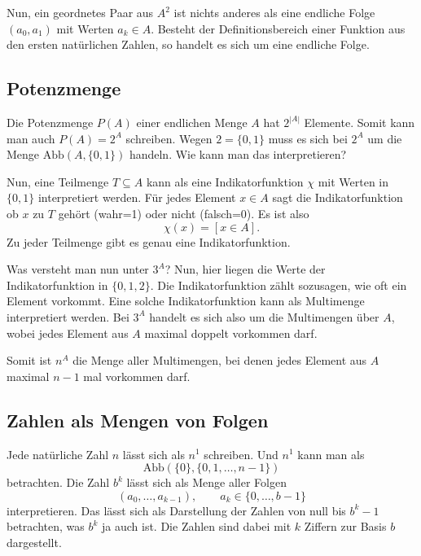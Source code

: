 \documentclass[a4paper,12pt,fleqn]{article}
\begin{document}
Nun, ein geordnetes Paar aus $A^2$ ist nichts anderes als eine
endliche Folge $(a_0,a_1)$ mit Werten $a_k\in A$. Besteht der
Definitionsbereich einer Funktion aus den ersten natürlichen Zahlen,
so handelt es sich um eine endliche Folge.

\subsection{Potenzmenge}
Die Potenzmenge $P(A)$ einer endlichen Menge $A$ hat
$2^{|A|}$ Elemente. Somit kann man auch $P(A)=2^A$ schreiben.
Wegen $2=\{0,1\}$ muss es sich bei $2^A$ um die Menge
$\mathrm{Abb}(A,\{0,1\})$ handeln. Wie kann man das interpretieren?

Nun, eine Teilmenge $T\subseteq A$ kann als eine
Indikatorfunktion \(\chi\) mit Werten in $\{0,1\}$ interpretiert werden.
Für jedes Element $x\in A$ sagt die Indikatorfunktion ob $x$
zu $T$ gehört (wahr=1) oder nicht (falsch=0). Es ist also
\[\chi(x) = [x\in A].\]
Zu jeder Teilmenge gibt es genau eine Indikatorfunktion.

Was versteht man nun unter $3^A$? Nun, hier liegen die Werte der
Indikatorfunktion in $\{0,1,2\}$. Die Indikatorfunktion zählt
sozusagen, wie oft ein Element vorkommt. Eine solche
Indikatorfunktion kann als Multimenge interpretiert werden.
Bei $3^A$ handelt es sich also um die Multimengen über $A$, wobei
jedes Element aus $A$ maximal doppelt vorkommen darf.

Somit ist $n^A$ die Menge aller Multimengen, bei denen jedes
Element aus $A$ maximal $n-1$ mal vorkommen darf.

\subsection{Zahlen als Mengen von Folgen}
Jede natürliche Zahl $n$ lässt sich als $n^1$ schreiben. Und $n^1$
kann man als
\[\mathrm{Abb}(\{0\},\{0,1,\ldots,n-1\})\]
betrachten. Die Zahl $b^k$ lässt sich als Menge aller Folgen
\[(a_0,\ldots,a_{k-1}),\qquad a_k\in\{0,\ldots,b-1\}\]
interpretieren. Das lässt sich als Darstellung der Zahlen von null
bis $b^k-1$ betrachten, was $b^k$ ja auch ist. Die Zahlen sind
dabei mit $k$ Ziffern zur Basis $b$ dargestellt.
\end{document}
